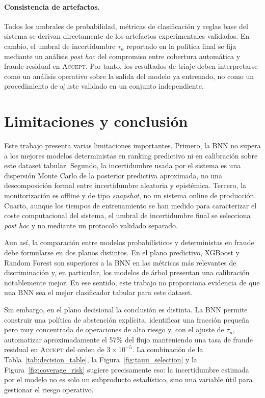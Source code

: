 \documentclass{article}
\begin{document}
\paragraph{Consistencia de artefactos.}
Todos los umbrales de probabilidad, métricas de clasificación y reglas base del sistema se derivan directamente de los artefactos experimentales validados. En cambio, el umbral de incertidumbre $\tau_u$ reportado en la política final se fija mediante un análisis \emph{post hoc} del compromiso entre cobertura automática y fraude residual en \textsc{Accept}. Por tanto, los resultados de triaje deben interpretarse como un análisis operativo sobre la salida del modelo ya entrenado, no como un procedimiento de ajuste validado en un conjunto independiente.

\FloatBarrier
\section{Limitaciones y conclusión}

Este trabajo presenta varias limitaciones importantes. Primero, la BNN no supera a los mejores modelos deterministas en ranking predictivo ni en calibración sobre este dataset tabular. Segundo, la incertidumbre usada por el sistema es una dispersión Monte Carlo de la posterior predictiva aproximada, no una descomposición formal entre incertidumbre aleatoria y epistémica. Tercero, la monitorización es offline y de tipo \emph{snapshot}, no un sistema online de producción. Cuarto, aunque los tiempos de entrenamiento se han medido para caracterizar el coste computacional del sistema, el umbral de incertidumbre final se selecciona \emph{post hoc} y no mediante un protocolo validado separado.

Aun así, la comparación entre modelos probabilísticos y deterministas en fraude debe formularse en dos planos distintos. En el plano predictivo, XGBoost y Random Forest son superiores a la BNN en las métricas más relevantes de discriminación y, en particular, los modelos de árbol presentan una calibración notablemente mejor. En ese sentido, este trabajo no proporciona evidencia de que una BNN sea el mejor clasificador tabular para este dataset.

Sin embargo, en el plano decisional la conclusión es distinta. La BNN permite construir una política de abstención explícita, identificar una fracción pequeña pero muy concentrada de operaciones de alto riesgo y, con el ajuste de $\tau_u$, automatizar aproximadamente el 57\% del flujo manteniendo una tasa de fraude residual en \textsc{Accept} del orden de $3\times10^{-5}$. La combinación de la Tabla~\ref{tab:decision_table}, la Figura~\ref{fig:tauu_selection} y la Figura~\ref{fig:coverage_risk} sugiere precisamente eso: la incertidumbre estimada por el modelo no es solo un subproducto estadístico, sino una variable útil para gestionar el riesgo operativo.
\end{document}
